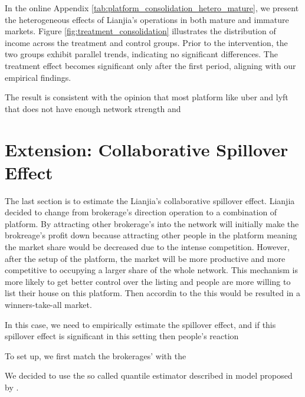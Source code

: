 \documentclass[11pt]{article}
\begin{document}
In the online Appendix \ref{tab:platform_consolidation_hetero_mature}, we present the heterogeneous effects of Lianjia's operations in both mature and immature markets. Figure \ref{fig:treatment_consolidation} illustrates the distribution of income across the treatment and control groups. Prior to the intervention, the two groups exhibit parallel trends, indicating no significant differences. The treatment effect becomes significant only after the first period, aligning with our empirical findings.


















The result is consistent with the opinion that most platform like uber and lyft that does not have enough network strength and \citep{10.1257/jep.28.2.3}

\citep{WOS:000454186600016}

\section{Extension: Collaborative Spillover Effect} \label{sec:network_effect}

The last section is to estimate the Lianjia's collaborative spillover effect. Lianjia decided to change from brokerage's direction operation to a combination of platform. By attracting other brokerage's into the network will initially make the brokreage's profit down because attracting other people in the platform meaning the market share would be decreased due to the intense competition. However, after the setup of the platform, the market will be more productive and more competitive to occupying a larger share of the whole network. This mechanism is more likely to get better control over the listing and people are more willing to list their house on this platform. Then accordin to the this would be resulted in a winners-take-all market.

In this case, we need to empirically estimate the spillover effect, and if this spillover effect is significant in this setting then people's reaction 

To set up, we first match the brokerages' with the 


We decided to use the so called quantile estimator described in model  proposed by \citep{machado_quantiles_2019}.
\end{document}
